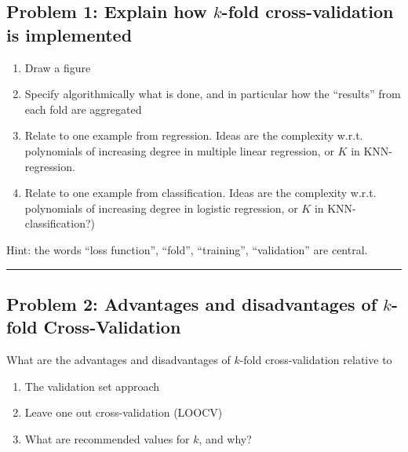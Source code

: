 \documentclass[]{article}
\providecommand{\tightlist}{%
  \setlength{\itemsep}{0pt}\setlength{\parskip}{0pt}}
\begin{document}
\subsection{\texorpdfstring{Problem 1: Explain how \(k\)-fold
cross-validation is
implemented}{Problem 1: Explain how k-fold cross-validation is implemented}}\label{problem-1-explain-how-k-fold-cross-validation-is-implemented}

\begin{enumerate}
\def\labelenumi{\alph{enumi})}
\item
  Draw a figure
\item
  Specify algorithmically what is done, and in particular how the
  ``results'' from each fold are aggregated
\item
  Relate to one example from regression. Ideas are the complexity w.r.t.
  polynomials of increasing degree in multiple linear regression, or
  \(K\) in KNN-regression.
\item
  Relate to one example from classification. Ideas are the complexity
  w.r.t. polynomials of increasing degree in logistic regression, or
  \(K\) in KNN-classification?)
\end{enumerate}

Hint: the words ``loss function'', ``fold'', ``training'',
``validation'' are central.

\begin{center}\rule{0.5\linewidth}{\linethickness}\end{center}

\subsection{\texorpdfstring{Problem 2: Advantages and disadvantages of
\(k\)-fold
Cross-Validation}{Problem 2: Advantages and disadvantages of k-fold Cross-Validation}}\label{problem-2-advantages-and-disadvantages-of-k-fold-cross-validation}

What are the advantages and disadvantages of \(k\)-fold cross-validation
relative to

\begin{enumerate}
\def\labelenumi{\alph{enumi})}
\tightlist
\item
  The validation set approach
\item
  Leave one out cross-validation (LOOCV)
\item
  What are recommended values for \(k\), and why?
\end{enumerate}
\end{document}
